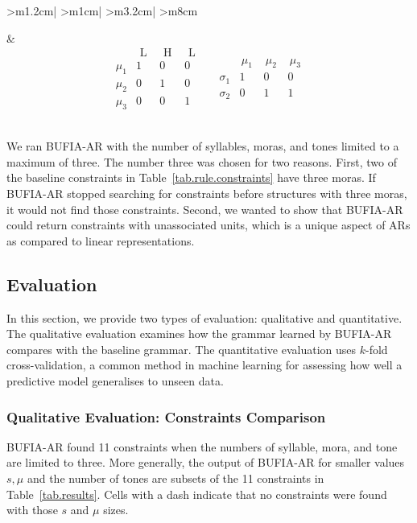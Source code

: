\begin{table}[ht]
\begin{tabular}{
			>{\centering\arraybackslash}m{1.2cm}|
			>{\centering\arraybackslash}m{1cm}|
			>{\centering\arraybackslash}m{3.2cm}|
			>{\centering\arraybackslash}m{8cm}
		}
\begin{tikzpicture}[scale=.85,every node/.style={scale=.85}]
			\draw (t0)--(c1)--(s1);
			\draw (t1)--(c2)--(s2);
			\draw (t2)--(c3)--(s2);
		\end{tikzpicture}
		&
		\[
		\begin{array}{c|ccc}
			& \text{ L } & \text{ H } & \text{ L }\\
			\hline
			\mu_1 & 1 & 0 & 0\\
			\mu_2 & 0 & 1 & 0\\
			\mu_3 & 0 & 0 & 1
		\end{array}
		\quad
		\begin{array}{c|ccc}
			& \,\mu_1\, &\,\mu_2 \,& \,\mu_3\,\\
			\hline
			\sigma_1 & 1 & 0 & 0\\
			\sigma_2 & 0 & 1 & 1
		\end{array}
		\]
		\\		\bottomrule
	\end{tabular}
	
	\caption{Corresponding lexical forms, ARs, and their matrix-based encodings.}
	\label{tab.conversion}
\end{table}

We ran BUFIA-AR with the number of syllables,
moras, and tones limited to a maximum of three. 
The number three was chosen for two reasons. 
First, two of the baseline constraints in
Table~\ref{tab.rule.constraints} have three moras. 
If BUFIA-AR stopped searching for constraints before 
structures with three moras, it would not find those 
constraints. Second, we wanted to show that BUFIA-AR 
could return constraints with unassociated units, which 
is a unique aspect of ARs as compared to linear 
representations.

\subsection{Evaluation}
In this section, we provide two types of evaluation: qualitative and 
quantitative. The qualitative evaluation examines how the grammar learned 
by BUFIA-AR compares with the baseline grammar. The quantitative 
evaluation uses $k$-fold cross-validation,
a common method in machine learning for assessing 
how well a predictive model generalises to unseen data. 
\subsubsection{Qualitative Evaluation: Constraints Comparison}
BUFIA-AR found 11 constraints when the numbers of 
syllable, mora, and tone are limited to three. 
More generally, the output of BUFIA-AR for smaller 
values $s,\mu$ and the number of tones are subsets 
of the 11 constraints in Table~\ref{tab.results}. 
Cells with a dash indicate that no constraints were 
found with those $s$ and $\mu$ sizes.  

